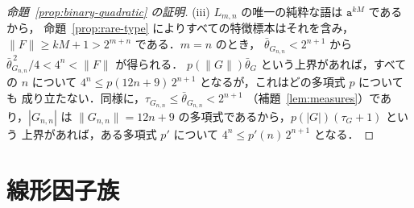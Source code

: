 \documentclass[11pt,a4paper]{ltjsarticle}
\numberwithin{equation}{section}
\theoremstyle{plain}
\theoremstyle{definition}
\theoremstyle{remark}
\theoremstyle{plain}
\begin{document}
\begin{proof}[命題~\ref{prop:binary-quadratic} の証明]
(iii) $L_{m,n}$ の唯一の純粋な語は $\mathtt a^{kM}$ であるから，
命題~\ref{prop:rare-type} によりすべての特徴標本はそれを含み，
$\|F\|\ge kM+1>2^{m+n}$ である．$m=n$ のとき，
$\bar\theta_{G_{n,n}}<2^{n+1}$ から
$\bar\theta_{G_{n,n}}^{\,2}/4<4^n<\|F\|$ が得られる．
$p(\|G\|)\bar\theta_G$ という上界があれば，すべての $n$ について
$4^n\le p(12n+9)\,2^{n+1}$ となるが，これはどの多項式 $p$ についても
成り立たない．同様に，$\tau_{G_{n,n}}\le\bar\theta_{G_{n,n}}<2^{n+1}$
（補題~\ref{lem:measures}）であり，$|G_{n,n}|$ は
$\|G_{n,n}\|=12n+9$ の多項式であるから，$p(|G|)(\tau_G+1)$ という
上界があれば，ある多項式 $p'$ について $4^n\le p'(n)\,2^{n+1}$ となる．
\end{proof}

\section{線形因子族}
\label{app:linear}
\end{document}
